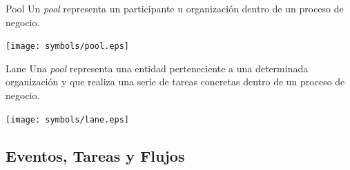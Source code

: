 \documentclass[a4paper,slidestop,xcolor=pst,blue]{beamer}
\begin{document}
\begin{frame}[c]
    \begin{block}{Pool}
        Un \emph{pool} representa un participante u organización dentro de un proceso de negocio.
        \ \\
        \begin{center}
            \texttt{[image: symbols/pool.eps]}
        \end{center}
    \end{block}
    \begin{block}{Lane}
        Una \emph{pool} representa una entidad perteneciente a una determinada organización y que realiza una serie de tareas concretas dentro de un proceso de negocio.  
        \ \\
        \begin{center}
            \texttt{[image: symbols/lane.eps]}
        \end{center}
    \end{block}
\end{frame}

\subsection{Eventos, Tareas y Flujos}
\end{document}
